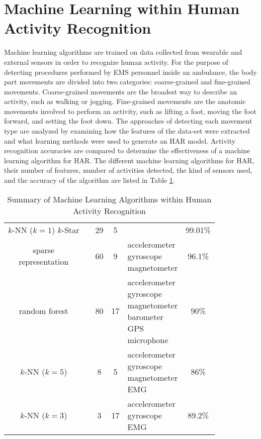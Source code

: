 \section{Machine Learning within Human Activity Recognition}
\label{sec:Literature-Review:Machine-Learning-Classifiers}
Machine learning algorithms are trained on data collected from wearable and external sensors in order to recognize human activity. For the purpose of detecting procedures performed by EMS personnel inside an ambulance, the body part movements are divided into two categories: coarse-grained and fine-grained movements. Coarse-grained movements are the broadest way to describe an activity, such as walking or jogging. Fine-grained movements are the anatomic movements involved to perform an activity, such as lifting a foot, moving the foot forward, and setting the foot down. The approaches of detecting each movement type are analyzed by examining how the features of the data-set were extracted and what learning methods were used to generate an HAR model. Activity recognition accuracies are compared to determine the effectiveness of a machine learning algorithm for \gls{HAR}. The different machine learning algorithms for HAR, their number of features, number of activities detected, the kind of sensors used, and the accuracy of the algorithm are listed in Table \ref{machine-learning-summary}.
\begin{table}[h]
	\centering
	\caption{Summary of Machine Learning Algorithms within Human Activity Recognition}
	\label{machine-learning-summary}
	\begin{tabularx}{\textwidth}{|c|c|c|c|X|c|}
		\hline
		\thead{Algorithm} & \thead{Paper} & \thead{Features} & \thead{Activities} & \thead{Sensors used} & \thead{Accuracy}   \\\hline
		\makecell{$k$-NN ($k=1$) \\ $k$-Star} & \cite{Wannenburg2016}  & 29         & 5 & \makecell{accelerometer} & 99.01\% \\\hline
		\makecell{sparse \\ representation} & \cite{Zhang2013} & 60 & 9 & \makecell{accelerometer \\ gyroscope \\ magnetometer} & 96.1\% \\\hline\hline
		random forest & \cite{Dorfmeister2014} & 80 & 17 & \makecell{accelerometer \\ gyroscope \\ magnetometer \\ barometer \\ GPS \\ microphone} & 90\% \\\hline
		$k$-NN ($k=5$) & \cite{Benalcazar2017}  & 8 & 5 & \makecell{accelerometer \\ gyroscope \\ magnetometer \\ EMG} & 86\% \\\hline
		$k$-NN ($k=3$) & \cite{Totty2017}  & 3 & 17 & \makecell{accelerometer \\ gyroscope \\ EMG} & 89.2\% \\\hline
	\end{tabularx}
\end{table}
